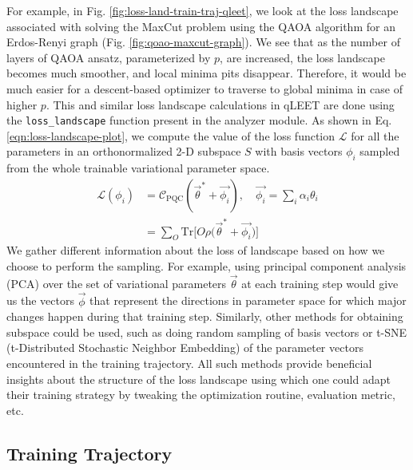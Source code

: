 For example, in Fig. \ref{fig:loss-land-train-traj-qleet}, we look at the loss landscape associated with solving the MaxCut problem using the QAOA algorithm \cite{2014arXiv1411.4028F} for an Erdos-Renyi graph (Fig. \ref{fig:qoao-maxcut-graph}). We see that as the number of layers of QAOA ansatz, parameterized by $p$, are increased, the loss landscape becomes much smoother, and local minima pits disappear. Therefore, it would be much easier for a descent-based optimizer to traverse to global minima in case of higher $p$. This and similar loss landscape calculations in qLEET are done using the \texttt{loss\_landscape} function present in the analyzer module. As shown in Eq. \ref{eqn:loss-landscape-plot}, we compute the value of the loss function $\mathcal{L}$ for all the parameters in an orthonormalized 2-D subspace $S$ with basis vectors $\phi_i$ sampled from the whole trainable variational parameter space. 
\begin{equation}\label{eqn:loss-landscape-plot}
    \begin{split}
        \mathcal{L}(\phi_i) 
        &= \mathcal{C}_{\text{PQC}}(\vec{\theta}^* + \vec{\phi_i}), \quad \vec{\phi_i} = \sum_i \alpha_i \theta_i\\ 
        &= \sum_{O} \text{Tr}\Bigg[O\rho \bigg(\vec{\theta}^* + \vec{\phi_i} \bigg) \Bigg]
    \end{split}
\end{equation}
We gather different information about the loss of landscape based on how we choose to perform the sampling. For example, using principal component analysis (PCA) over the set of variational parameters $\vec{\theta}$ at each training step would give us the vectors $\vec{\phi}$ that represent the directions in parameter space for which major changes happen during that training step. Similarly, other methods for obtaining subspace could be used, such as doing random sampling of basis vectors or t-SNE (t-Distributed Stochastic Neighbor Embedding) of the parameter vectors encountered in the training trajectory. All such methods provide beneficial insights about the structure of the loss landscape using which one could adapt their training strategy by tweaking the optimization routine, evaluation metric, etc. 

\subsection{Training Trajectory}

